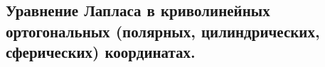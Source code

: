 \subsection{Уравнение Лапласа в криволинейных ортогональных (полярных, цилиндрических, сферических) координатах.}